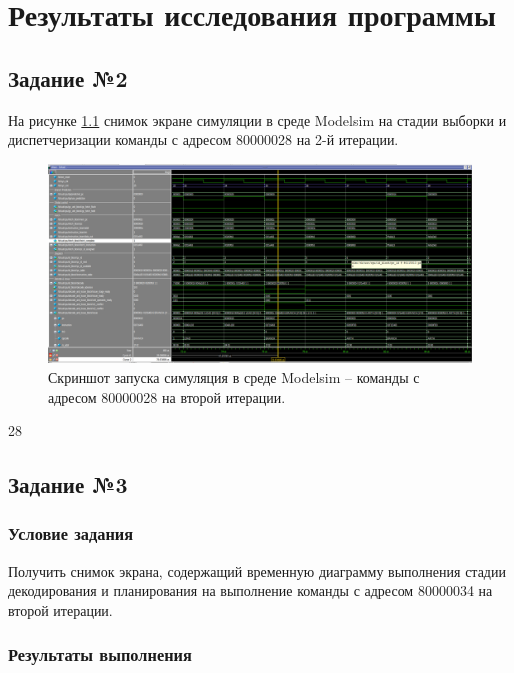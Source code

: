 \chapter{Результаты исследования программы}

\section{Задание №2}

На рисунке \ref{img:2} снимок экране симуляции в среде Modelsim на стадии выборки и диспетчеризации  команды с адресом 80000028 на 2-й итерации.

\begin{figure}[h]
	\centering
	\includegraphics[height=0.35\textheight]{img/2}
	\caption{Скриншот запуска симуляция в среде Modelsim -- команды с адресом 80000028 на второй итерации.}
	\label{img:2}
\end{figure}28

\clearpage

\section{Задание №3}

\subsection*{Условие задания}
Получить снимок экрана, содержащий временную диаграмму выполнения стадии декодирования и планирования на выполнение команды с адресом 80000034 на второй итерации.

\subsection*{Результаты выполнения}

